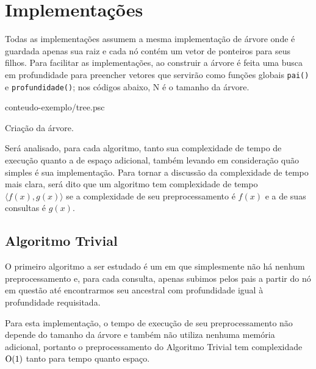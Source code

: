 \section{Implementações}

Todas as implementações assumem a mesma implementação de árvore onde é
guardada apenas sua raiz e cada nó contém um vetor de ponteiros para seus
filhos. Para facilitar as implementações, ao construir a árvore é feita uma
busca em profundidade para preencher vetores que servirão como funções globais
\texttt{pai()} e \texttt{profundidade()}; nos códigos abaixo, N é o tamanho da
árvore.

\begin{program}[H]
  
  {conteudo-exemplo/tree.psc}

  \caption{Criação da árvore.\label{prog:tree}}
\end{program}

Será analisado, para cada algoritmo, tanto sua complexidade de
tempo de execução quanto a de espaço adicional, também levando em consideração quão
simples é sua implementação.
Para tornar a discussão da complexidade de tempo mais clara, será dito que
um algoritmo tem complexidade de tempo $\langle f(x), g(x) \rangle$ se a complexidade de
seu  preprocessamento é $f(x)$ e a de suas consultas é $g(x)$.

\subsection{Algoritmo Trivial}
O primeiro algoritmo a ser estudado é um em que simplesmente não há
nenhum preprocessamento e, para cada consulta, apenas subimos pelos pais a
partir do nó em questão até encontrarmos seu ancestral com profundidade igual
à profundidade requisitada.

Para esta implementação, o tempo de execução de seu preprocessamento não depende do
tamanho da árvore e também não utiliza nenhuma memória adicional, portanto o
preprocessamento do Algoritmo Trivial tem complexidade $\mathrm{O}(1)$ tanto para tempo
quanto espaço.

